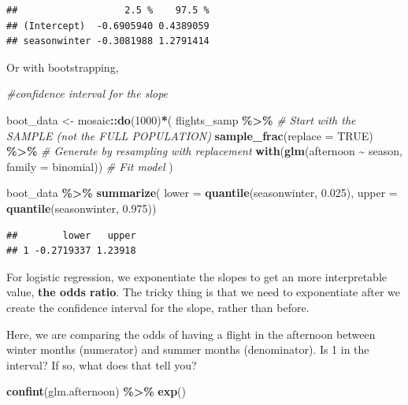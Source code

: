 \documentclass[
]{book}
\newenvironment{Shaded}{\begin{snugshade}}{\end{snugshade}}
\newcommand{\AttributeTok}[1]{\textcolor[rgb]{0.13,0.29,0.53}{#1}}
\newcommand{\CommentTok}[1]{\textcolor[rgb]{0.56,0.35,0.01}{\textit{#1}}}
\newcommand{\ConstantTok}[1]{\textcolor[rgb]{0.56,0.35,0.01}{#1}}
\newcommand{\DecValTok}[1]{\textcolor[rgb]{0.00,0.00,0.81}{#1}}
\newcommand{\FloatTok}[1]{\textcolor[rgb]{0.00,0.00,0.81}{#1}}
\newcommand{\FunctionTok}[1]{\textcolor[rgb]{0.13,0.29,0.53}{\textbf{#1}}}
\newcommand{\NormalTok}[1]{#1}
\newcommand{\OtherTok}[1]{\textcolor[rgb]{0.56,0.35,0.01}{#1}}
\newcommand{\SpecialCharTok}[1]{\textcolor[rgb]{0.81,0.36,0.00}{\textbf{#1}}}
\newcommand{\StringTok}[1]{\textcolor[rgb]{0.31,0.60,0.02}{#1}}
\begin{document}
\begin{verbatim}
##                   2.5 %    97.5 %
## (Intercept)  -0.6905940 0.4389059
## seasonwinter -0.3081988 1.2791414
\end{verbatim}

Or with bootstrapping,

\begin{Shaded}
\begin{Highlighting}[]
\CommentTok{\#confidence interval for the slope}

\NormalTok{boot\_data }\OtherTok{\textless{}{-}}\NormalTok{ mosaic}\SpecialCharTok{::}\FunctionTok{do}\NormalTok{(}\DecValTok{1000}\NormalTok{)}\SpecialCharTok{*}\NormalTok{( }
\NormalTok{    flights\_samp }\SpecialCharTok{\%\textgreater{}\%} \CommentTok{\# Start with the SAMPLE (not the FULL POPULATION)}
    \FunctionTok{sample\_frac}\NormalTok{(}\AttributeTok{replace =} \ConstantTok{TRUE}\NormalTok{) }\SpecialCharTok{\%\textgreater{}\%} \CommentTok{\# Generate by resampling with replacement}
    \FunctionTok{with}\NormalTok{(}\FunctionTok{glm}\NormalTok{(afternoon }\SpecialCharTok{\textasciitilde{}}\NormalTok{ season, }\AttributeTok{family =} \StringTok{\textquotesingle{}binomial\textquotesingle{}}\NormalTok{)) }\CommentTok{\# Fit model}
\NormalTok{)}

\NormalTok{boot\_data }\SpecialCharTok{\%\textgreater{}\%}
  \FunctionTok{summarize}\NormalTok{(}
    \AttributeTok{lower =} \FunctionTok{quantile}\NormalTok{(seasonwinter, }\FloatTok{0.025}\NormalTok{),}
    \AttributeTok{upper =} \FunctionTok{quantile}\NormalTok{(seasonwinter, }\FloatTok{0.975}\NormalTok{))}
\end{Highlighting}
\end{Shaded}

\begin{verbatim}
##        lower   upper
## 1 -0.2719337 1.23918
\end{verbatim}

For logistic regression, we exponentiate the slopes to get an more interpretable value, \textbf{the odds ratio}. The tricky thing is that we need to exponentiate after we create the confidence interval for the slope, rather than before.

Here, we are comparing the odds of having a flight in the afternoon between winter months (numerator) and summer months (denominator). Is 1 in the interval? If so, what does that tell you?

\begin{Shaded}
\begin{Highlighting}[]
\FunctionTok{confint}\NormalTok{(glm.afternoon) }\SpecialCharTok{\%\textgreater{}\%} 
  \FunctionTok{exp}\NormalTok{()}
\end{Highlighting}
\end{Shaded}
\end{document}
